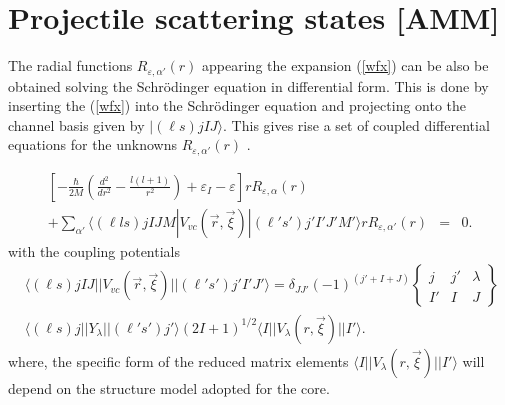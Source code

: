 \documentclass[preprint,12pt]{elsarticle}
\begin{document}
\section{Projectile scattering states [AMM] }
The radial functions $R_{\varepsilon,\alpha '}(r)$ appearing the expansion (\ref{wfx}) can be also be obtained solving the Schr\"odinger equation in differential form. This is done by inserting the (\ref{wfx})
into the Schr\"odinger equation and projecting onto the channel basis given by $|(\ell s)j I J  \rangle$. This gives rise a set of coupled differential equations for the unknowns  $R_{\varepsilon,\alpha '}(r)$  \cite{BM}.   

\begin{eqnarray}
\nonumber \left[  -\frac{\hbar}{2 M}\left( \frac{d^2}{dr^2}-\frac{l(l+1)}{r^2} \right) + \varepsilon_{I} - \varepsilon \right] r R_{\varepsilon,\alpha}(r) & & \\
 + \sum_{\alpha '} \langle (\ell ls)j I JM | V_{vc}(\vec{r},\vec{\xi}) |(\ell's')j' I' J'M' \rangle r R_{\varepsilon,\alpha '}(r) &= & 0 .
\end{eqnarray}
with the coupling potentials 
\begin{eqnarray}
& \langle (\ell s)j I J || V_{vc}(\vec{r},\vec{\xi}) || (\ell's')j' I' J' \rangle  =  \delta_{JJ'}(-1)^{(j'+I+J)} 
\left\lbrace \begin{array}{ccc} j & j' & \lambda \\ I'& I & J  \end{array} \right\rbrace 
\nonumber & \\
& \langle (\ell s)j || Y_{\lambda } || (\ell' s')j' \rangle (2I+1)^{1/2}  \langle I || V_{\lambda}(r,\vec{\xi}) || I' \rangle . &
\label{couppot}
\end{eqnarray}
where, the specific form of the reduced matrix elements $\langle I || V_{\lambda}(r,\vec{\xi}) || I' \rangle$ will depend 
on the structure model adopted for the core. 
\end{document}
